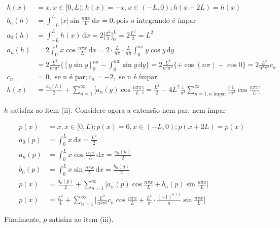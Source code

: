 \documentclass[12pt,a4paper]{article}
\begin{document}
		\begin{align}
			h(x) &= x, x \in [0, L) ; h(x) = -x, x \in (-L, 0) ; h(x + 2L) = h(x) \\
			b_n(h) &= \int_{-L}^L |x| \sin \frac{n \pi x}{L} \,\mathrm{d}x = 0, \text{pois o integrando \'e \'impar} \\
			a_0(h) &= \int_{-L}^L h(x)\,\mathrm{d}x = 2 \bigg[ \frac{x^2}{2} \bigg]_{0}^L = 2 \frac{L^2}{2} = L^2 \\
			a_n(h) &= 2 \int_{0}^L x \cos \frac{n \pi x}{L} \,\mathrm{d}x = 2\cdot\frac{L}{n\pi}\cdot\frac{L}{n\pi} \int_{0}^{n\pi} y \cos y \,\mathrm{d}y \\
			&= 2 \frac{L^2}{n^2\pi^2} \bigg\{[y \sin y]_0^{n\pi} - \int_{0}^{n\pi} \sin y \,\mathrm{d}y \bigg\} = 2 \frac{L^2}{n^2\pi^2} \{ + \cos (n\pi) - \cos 0 \} = 2 \frac{L^2}{n^2\pi^2} c_n \\
			c_n &= 0, \text{ se n \'e par} ; c_n = -2, \text{ se n \'e \'impar} \\
			h(x) &= \frac{a_0(h)}{2} + \sum_{n = 1}^\infty \bigg[ a_n(g) \cos \frac{n\pi x}{L} \bigg] = \frac{L^2}{2} -4 L^2 \frac{1}{\pi^2} \sum_{n = 1, n \text{ \'impar}}^\infty \bigg[ \frac{1}{n^2} \cos \frac{n\pi x}{L} \bigg]
		\end{align}

		$h$ satisfaz ao item (ii). Considere agora a extens\~ao nem par, nem \'impar

		\begin{align}
			p(x) &= x, x \in [0, L) ; p(x) = 0, x \in (-L, 0) ; p(x + 2L) = p(x) \\
			a_0(p) &= \int_0^L x\,\mathrm{d}x = \frac{L^2}{2} \\
			a_n(p) &= \int_0^L x \cos \frac{n\pi x}{L} \,\mathrm{d}x = \frac{a_n(h)}{2} \\
			b_n(p) &= \int_0^L x \sin \frac{n\pi x}{L} \,\mathrm{d}x = \frac{b_n(g)}{2} \\
			p(x) &= \frac{a_0(p)}{2} + \sum_{n = 1}^\infty \bigg[ a_n(p) \cos \frac{n\pi x}{L} + b_n(p) \sin \frac{n\pi x}{L} \bigg] \\
			p(x) &= \frac{L^2}{4} + \sum_{n = 1}^\infty \bigg[ \frac{L^2}{n^2\pi^2} c_n \cos \frac{n\pi x}{L} + \frac{L^2}{\pi} \cdot \frac{(-1)^{n+1}}{n} \sin \frac{n\pi x}{L} \bigg]
		\end{align}

		Finalmente, $p$ satisfaz ao item (iii).

		\begin{flushright}
		\end{flushright}
\end{document}
